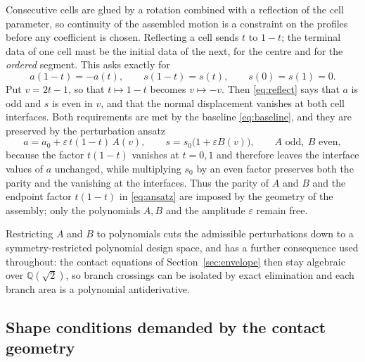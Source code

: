\documentclass[11pt]{article}
\theoremstyle{plain}
\theoremstyle{definition}
\theoremstyle{remark}
\newcommand{\Q}{\mathbb{Q}}
\begin{document}
Consecutive cells are glued by a rotation combined with a reflection of the cell
parameter, so continuity of the assembled motion is a constraint on the profiles
before any coefficient is chosen. Reflecting a cell sends $t$ to $1-t$; the
terminal data of one cell must be the initial data of the next, for the centre
and for the \emph{ordered} segment. This asks exactly for
\begin{equation}\label{eq:reflect}
  a(1-t)=-a(t),\qquad s(1-t)=s(t),\qquad s(0)=s(1)=0 .
\end{equation}
Put $v=2t-1$, so that $t\mapsto1-t$ becomes $v\mapsto-v$. Then \eqref{eq:reflect}
says that $a$ is odd and $s$ is even in $v$, and that the normal displacement
vanishes at both cell interfaces. Both requirements are met by the baseline
\eqref{eq:baseline}, and they are preserved by the perturbation ansatz
\begin{equation}\label{eq:ansatz}
  a=a_{0}+\varepsilon\, t(1-t)\,A(v),
  \qquad
  s=s_{0}\bigl(1+\varepsilon B(v)\bigr),
  \qquad A\text{ odd},\ B\text{ even},
\end{equation}
because the factor $t(1-t)$ vanishes at $t=0,1$ and therefore leaves the
interface values of $a$ unchanged, while multiplying $s_{0}$ by an even factor
preserves both the parity and the vanishing at the interfaces. Thus the parity
of $A$ and $B$ and the endpoint factor $t(1-t)$ in \eqref{eq:ansatz} are imposed
by the geometry of the assembly; only the polynomials $A,B$ and the amplitude
$\varepsilon$ remain free.

Restricting $A$ and $B$ to polynomials cuts the admissible perturbations down
to a symmetry-restricted polynomial design space, and has a further consequence
used throughout: the contact equations of Section~\ref{sec:envelope} then stay
algebraic over $\Q(\sqrt2)$, so branch crossings can be isolated by exact
elimination and each branch area is a polynomial antiderivative.

\subsection{Shape conditions demanded by the contact geometry}
\label{sec:signrole}
\end{document}
